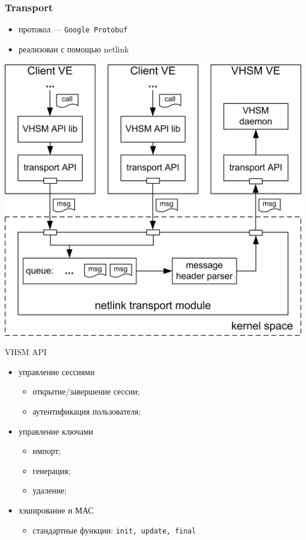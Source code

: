 \documentclass[utf8, 11pt]{beamer}
\begin{document}
\begin{frame}[fragile]
\frametitle{Transport}
\begin{itemize}
\item протокол --- \texttt{Google Protobuf}
\item реализован с помощью netlink
\end{itemize}
\begin{center}
\includegraphics[scale=0.65]{img4}
\end{center}
\end{frame}

\begin{frame}{VHSM API}

\begin{itemize}
\item управление сессиями
\begin{itemize}
\item открытие/завершение сессии;
\item аутентификация пользователя;
\end{itemize}

\item управление ключами
\begin{itemize}
\item импорт;
\item генерация;
\item удаление;
\end{itemize}

\item хэширование и МАС
\begin{itemize}
\item стандартные функции: \texttt{init, update, final}
\end{itemize}
\end{itemize}

\vspace*{\fill}

\end{frame}
\end{document}
